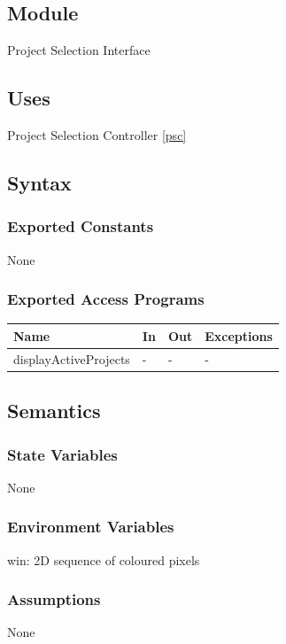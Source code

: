\documentclass[12pt, titlepage]{article}
\begin{document}
\subsection{Module}

Project Selection Interface

\subsection{Uses}

Project Selection Controller \ref{psc}

\subsection{Syntax}

\subsubsection{Exported Constants}
None
\subsubsection{Exported Access Programs}

\begin{center}
\begin{tabular}{p{4cm} p{4cm} p{4cm} p{2cm}}
\hline
\textbf{Name} & \textbf{In} & \textbf{Out} & \textbf{Exceptions} \\
\hline
displayActiveProjects & - & - & - \\
\hline
\end{tabular}
\end{center}

\subsection{Semantics}

\subsubsection{State Variables}
None
\subsubsection{Environment Variables}
win: 2D sequence of coloured pixels

\subsubsection{Assumptions}
None
\end{document}
